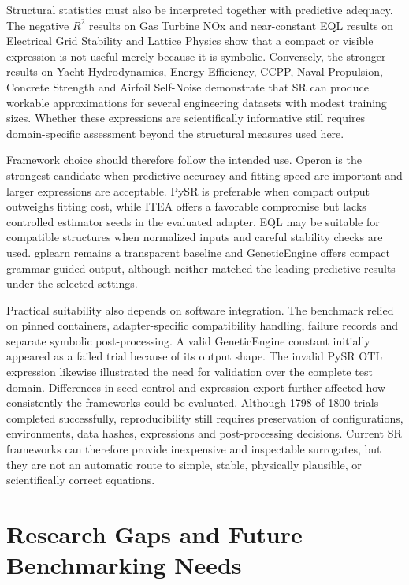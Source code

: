 \documentclass[12pt,oneside,bibtotoc,liststotoc]{scrbook}
\begin{document}
Structural statistics must also be interpreted together with predictive adequacy. The negative $R^2$ results on Gas Turbine NOx and near-constant EQL results on Electrical Grid Stability and Lattice Physics show that a compact or visible expression is not useful merely because it is symbolic. Conversely, the stronger results on Yacht Hydrodynamics, Energy Efficiency, CCPP, Naval Propulsion, Concrete Strength and Airfoil Self-Noise demonstrate that SR can produce workable approximations for several engineering datasets with modest training sizes. Whether these expressions are scientifically informative still requires domain-specific assessment beyond the structural measures used here.

Framework choice should therefore follow the intended use. Operon is the strongest candidate when predictive accuracy and fitting speed are important and larger expressions are acceptable. PySR is preferable when compact output outweighs fitting cost, while ITEA offers a favorable compromise but lacks controlled estimator seeds in the evaluated adapter. EQL may be suitable for compatible structures when normalized inputs and careful stability checks are used. gplearn remains a transparent baseline and GeneticEngine offers compact grammar-guided output, although neither matched the leading predictive results under the selected settings.

Practical suitability also depends on software integration. The benchmark relied on pinned containers, adapter-specific compatibility handling, failure records and separate symbolic post-processing. A valid GeneticEngine constant initially appeared as a failed trial because of its output shape. The invalid PySR OTL expression likewise illustrated the need for validation over the complete test domain. Differences in seed control and expression export further affected how consistently the frameworks could be evaluated. Although 1798 of 1800 trials completed successfully, reproducibility still requires preservation of configurations, environments, data hashes, expressions and post-processing decisions. Current SR frameworks can therefore provide inexpensive and inspectable surrogates, but they are not an automatic route to simple, stable, physically plausible, or scientifically correct equations.

\section{Research Gaps and Future Benchmarking Needs}
\end{document}
